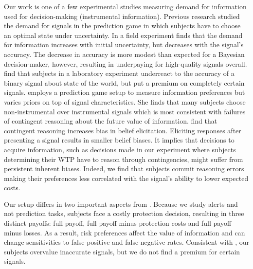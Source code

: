 \documentclass[12pt,a4paper]{article}
\begin{document}
Our work is one of a few experimental studies measuring demand for information used for decision-making (instrumental information). Previous research studied the demand for signals in the prediction game in which subjects have to choose an optimal state under uncertainty. In a field experiment \citet{hoffman_how_2016} finds that the demand for information increases with initial uncertainty, but decreases with the signal's accuracy. The decrease in accuracy is more modest than expected for a Bayesian decision-maker, however, resulting in underpaying for high-quality signals overall. \citet{ambuehl_belief_2018} find that subjects in a laboratory experiment underreact to the accuracy of a binary signal about state of the world, but put a premium on completely certain signals. \citet{xu_revealed_2022} employs a prediction game setup to measure information preferences but varies priors on top of signal characteristics. She finds that many subjects choose non-instrumental over instrumental signals which is most consistent with failures of contingent reasoning about the future value of information.  \citet{aina_contingent_2023} find that contingent reasoning increases bias in belief elicitation. Eliciting responses after presenting a signal results in smaller belief biases.  It implies that decisions to acquire information, such as decisions made in our experiment where subjects determining their WTP have to reason through contingencies, might suffer from persistent inherent biases.  Indeed, we find that subjects commit reasoning errors making their preferences less correlated with the signal's ability to lower expected costs. 

Our setup differs in two important aspects from \citep*{ambuehl_belief_2018, xu_revealed_2022}.  Because we study alerts and not prediction tasks, subjects face a costly protection decision, resulting in three distinct payoffs: full payoff, full payoff minus protection costs and full payoff minus losses. As a result, risk preferences affect the value of information and can change sensitivities to false-positive and false-negative rates. Consistent with \citet{ambuehl_belief_2018}, our subjects overvalue inaccurate signals, but we do not find a premium for certain signals.  
\end{document}
